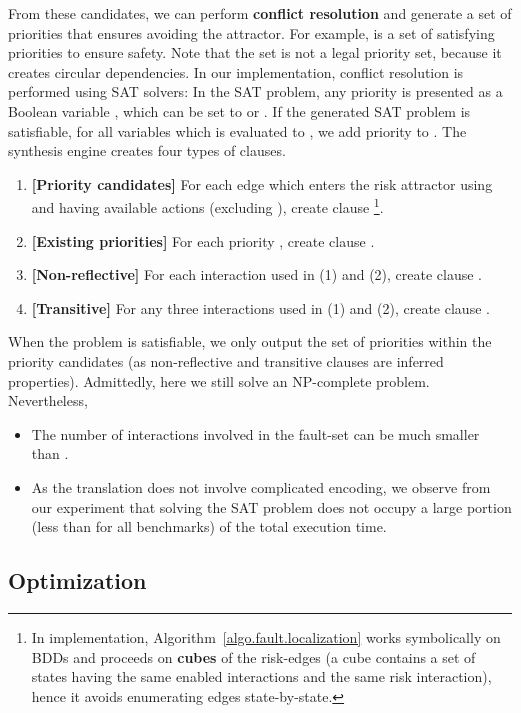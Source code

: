 \documentclass[10pt, a4paper, onecolumn, conference, compsocconf]{IEEEtran}
\begin{document}
From these candidates, we can perform \textbf{conflict resolution} and
generate a set of priorities that ensures avoiding the attractor.  For
example,  is a set of satisfying
priorities to ensure safety. Note that the set  is not a legal priority set, because it creates circular
dependencies. In our implementation, conflict resolution is performed
using SAT solvers: In the SAT problem, any priority  is presented as a Boolean variable , which can be set to  or .  If the
generated SAT problem is satisfiable, for all variables
 which is evaluated to ,
we add priority  to . The
synthesis engine creates four types of clauses. \begin{enumerate}
    \item \textbf{[Priority candidates]} For each edge  which enters the risk attractor using  and having  available actions (excluding ), create clause \footnote{In implementation, Algorithm~\ref{algo.fault.localization} works symbolically on BDDs and proceeds on \textbf{cubes} of the risk-edges (a cube contains a set of states having the same enabled interactions and the same risk interaction), hence it avoids enumerating edges state-by-state.}.
    \item \textbf{[Existing priorities]} For each priority , create
        clause .
    \item \textbf{[Non-reflective]} For each interaction  used in (1) and (2), create clause
            .
    \item \textbf{[Transitive]} For any three interactions   used in (1) and (2), create clause
            .
\end{enumerate}
\noindent When the problem is satisfiable, we only output the set of priorities within the priority candidates (as non-reflective and transitive clauses are inferred properties). Admittedly, here we still solve an NP-complete problem. Nevertheless,
\begin{itemize}
    \item The number of interactions involved in the fault-set can be much smaller than .
    \item As the translation does not involve complicated encoding, we observe from our experiment that solving the SAT problem does not occupy a large portion (less than  for all benchmarks) of the total execution time.
\end{itemize}




\subsection{Optimization}
\end{document}
